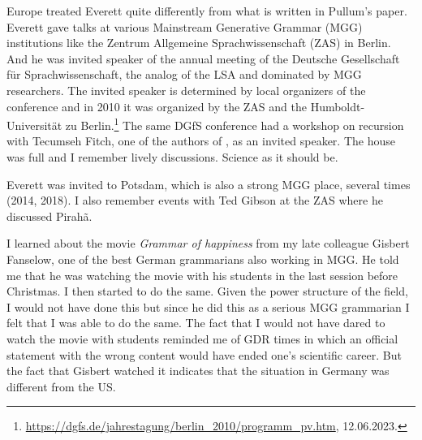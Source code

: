 \documentclass[output=paper,colorlinks,citecolor=brown]{langscibook}
\begin{document}
Europe treated Everett quite differently from what is written in Pullum's paper. Everett gave talks at
various Mainstream Generative Grammar (MGG) institutions like the Zentrum Allgemeine
Sprachwissenschaft (ZAS) in Berlin. And he was invited
speaker of the annual meeting of the Deutsche Gesellschaft für Sprachwissenschaft, the analog of the
LSA and dominated by MGG researchers. The invited speaker is determined by local organizers of the
conference and in 2010 it was organized by the ZAS and the Humboldt-Universität zu Berlin.\footnote{
\url{https://dgfs.de/jahrestagung/berlin_2010/programm_pv.htm}, 12.06.2023.
}
The same DGfS conference had a workshop on recursion with Tecumseh Fitch, one of the authors of
, as an invited speaker. The house was full and I remember lively
discussions. Science as it should be.

Everett was invited to Potsdam, which is also a strong MGG place, several times (2014, 2018). I also
remember events with Ted Gibson at the ZAS where he discussed Pirahã.

I learned about the movie \emph{Grammar of happiness} from my late colleague Gisbert Fanselow, one of
the best German grammarians also working in MGG. He told me that he was watching the movie with his
students in the last session before Christmas. I then started to do the same. Given the power
structure of the field, I would not have done this but since he did this as a serious MGG grammarian I
felt that I was able to do the same. The fact that I would not have dared to watch the movie with
students reminded me of GDR times in which an official statement with the wrong content would have
ended one's scientific career. But the fact that Gisbert watched it indicates that the situation in
Germany was different from the US.





\end{document}
